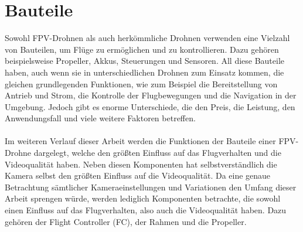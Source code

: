 
\section[Bauteile]{Bauteile}
    Sowohl FPV-Drohnen als auch herkömmliche Drohnen verwenden eine Vielzahl von Bauteilen, um Flüge zu ermöglichen und zu kontrollieren. Dazu gehören beispielsweise Propeller, Akkus, Steuerungen und Sensoren. All diese Bauteile haben, auch wenn sie in unterschiedlichen Drohnen zum Einsatz kommen, die gleichen grundlegenden Funktionen, wie zum Beispiel die Bereitstellung von Antrieb und Strom, die Kontrolle der Flugbewegungen und die Navigation in der Umgebung. Jedoch gibt es enorme Unterschiede, die den Preis, die Leistung, den Anwendungsfall und viele weitere Faktoren betreffen.
    \\ \\
    Im weiteren Verlauf dieser Arbeit werden die Funktionen der Bauteile einer FPV-Drohne dargelegt, welche den größten Einfluss auf das Flugverhalten und die Videoqualität haben. Neben diesen Komponenten hat selbstverständlich die Kamera selbst den größten Einfluss auf die Videoqualität. Da eine genaue Betrachtung sämtlicher Kameraeinstellungen und Variationen den Umfang dieser Arbeit sprengen würde, werden lediglich Komponenten betrachte, die sowohl einen Einfluss auf das Flugverhalten, also auch die Videoqualität haben. Dazu gehören der Flight Controller (FC), der Rahmen und die Propeller.
   
